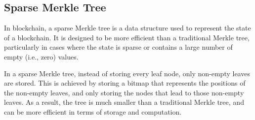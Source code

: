 \subsection{Sparse Merkle Tree}
In blockchain, a sparse Merkle tree is a data structure used to represent the state of a blockchain. It is designed to be more efficient than a traditional Merkle tree, particularly in cases where the state is sparse or contains a large number of empty (i.e., zero) values.

In a sparse Merkle tree, instead of storing every leaf node, only non-empty leaves are stored. This is achieved by storing a bitmap that represents the positions of the non-empty leaves, and only storing the nodes that lead to those non-empty leaves. As a result, the tree is much smaller than a traditional Merkle tree, and can be more efficient in terms of storage and computation.
